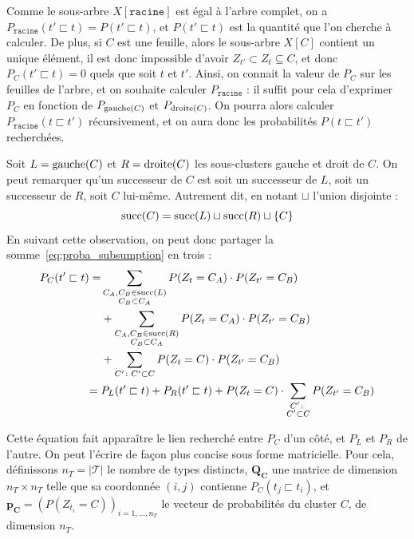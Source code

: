 Comme le sous-arbre $X[\texttt{racine}]$ est égal à l'arbre complet, on a $P_\texttt{racine}(t' \sqsubset t) = P(t' \sqsubset t)$, et $P(t' \sqsubset t)$ est la quantité que l'on cherche à calculer. De plus, si $C$ est une feuille, alors le sous-arbre $X[C]$ contient un unique élément, il est donc impossible d'avoir $Z_{t'} \subset Z_{t} \subseteq C$, et donc $P_C(t' \sqsubset t) = 0$ quels que soit $t$ et $t'$. 
Ainsi, on connait la valeur de $P_C$ sur les feuilles de l'arbre, et on souhaite calculer $P_\texttt{racine}$ : il suffit pour cela d'exprimer $P_C$ en fonction de $P_{\operatorname{gauche}(C)}$ et $P_{\operatorname{droite}(C)}$. On pourra alors calculer $P_\texttt{racine}(t \sqsubset t')$ récursivement, et on aura donc les probabilités $P(t \sqsubset t')$ recherchées.


Soit $L = \operatorname{gauche}(C)$ et $R = \operatorname{droite}(C)$ les sous-clusters gauche et droit de $C$. On peut remarquer qu'un successeur de $C$ est soit un successeur de $L$, soit un successeur de $R$, soit $C$ lui-même. Autrement dit, en notant $\sqcup$ l'union disjointe :
\begin{equation}
    \operatorname{succ}(C) = \operatorname{succ}(L) \sqcup \operatorname{succ}(R) \sqcup \{ C\}
\end{equation}
En suivant cette observation, on peut donc partager la somme~\ref{eq:proba_subsumption} en trois :
\begin{align}
P_{C}(t' \sqsubset t) = 
&
\sum_{\substack{C_A, C_B \in \operatorname{succ}(L) \\  C_B \subset C_A}} P(Z_t = C_A)\cdot P(Z_{t'} = C_B) 
\nonumber \\ 
&+ 
\sum_{\substack{C_A, C_B \in \operatorname{succ}(R) \\  C_B \subset C_A}} P(Z_t = C_A)\cdot P(Z_{t'} = C_B) 
\nonumber \\
&+ \displaystyle \sum_{C' \colon C' \subset C} P(Z_t = C) \cdot P(Z_{t'} = C_B) \nonumber \\
= {} & P_{L}(t' \sqsubset t) + P_{R}(t' \sqsubset t)  + P(Z_t=C)\cdot\sum_{\substack{C' \colon \\ C' \subset C}} P(Z_{t'} = C_B)
\label{eq:proba_over_subtree}
\end{align}

Cette équation fait apparaître le lien recherché entre $P_C$ d'un côté, et $P_L$ et $P_R$ de l'autre. On peut l'écrire de façon plus concise sous forme matricielle. Pour cela, définissons $n_T = | \mathcal{T} |$ le nombre de types distincts, $\mathbf{Q_C}$ une matrice de dimension $n_T \times n_T$ telle que sa coordonnée $(i, j)$ contienne $P_C(t_j \sqsubset t_i)$, et $\mathbf{p_C} = \left(P(Z_{t_i} = C)\right)_{i = 1, \ldots, n_T}$ le vecteur de probabilités du cluster $C$, de dimension $n_T$. 

